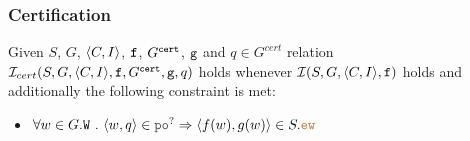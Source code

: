 \documentclass[12pt]{article}
\begin{document}
  






    

\subsubsection{Certification}

\begin{definition}
  Given $S$, $G$, $\langle C, I \rangle$, ${\mathtt{f}}$, $G^{{\mathtt{cert}}}$, ${\mathtt{g}}$ and $q \in G^{cert}$
  relation $\mathcal{I}_{cert}(S, G, \langle C, I \rangle, {\mathtt{f}}, G^{{\mathtt{cert}}}, {\mathtt{g}}, q)$ holds 
  whenever $\mathcal{I}(S, G, \langle C, I \rangle, {\mathtt{f}})$ holds and additionally 
  the following constraint is met:
  \begin{itemize}
    \item $\forall{w \in G.\lW} ~.~ \tup{w, q} \in \lPO^? \Rightarrow 
      \tup{f(w), g(w)} \in S.\lEW$
  \end{itemize}
\end{definition}
\end{document}
